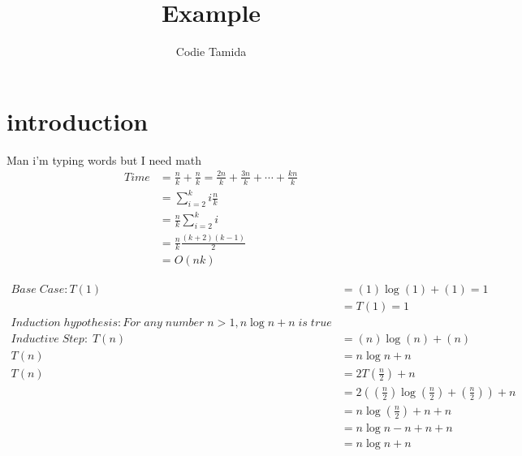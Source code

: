 \documentclass[12pt]{article}
\begin{document}
\title{Example}
\section{introduction}

\author{Codie Tamida}
Man i'm typing words but I need math 
    \begin{equation}
    \begin{split}
    Time &= \frac{n}{k} + \frac{n}{k} = \frac{2n}{k} + \frac{3n}{k}+\cdots+\frac{kn}{k}\\
     &= \sum_{i = 2}^{k} i \frac{n}{k}\\
     &= \frac{n}{k} \sum_{i =2}^{k} i\\
     &= \frac{n}{k} \frac{(k+2)(k-1)}{2}\\
     &=O(nk)
    \end{split}
    \end{equation}

    \begin{equation}
    \begin{split}
        Base\;Case: T(1) &= (1) \log(1) + (1) = 1\\
        &= T(1) =1\\
        Induction\;hypothesis: For\;any\;number\;n > 1, n \log n + n\;is\;true\\
        Inductive\;Step:\;T(n) &= (n) \log(n) +(n)\\
        T(n) &= n \log n + n\\
        T(n) &= 2T(\frac{n}{2}) + n\\
        &= 2((\frac{n}{2}) \log (\frac{n}{2}) + (\frac{n}{2})) + n\\
        &= n \log (\frac{n}{2}) + n + n\\
        &= n \log n - n + n + n\\
        &= n \log n + n
    \end{split}
    \end{equation}
\end{document}
